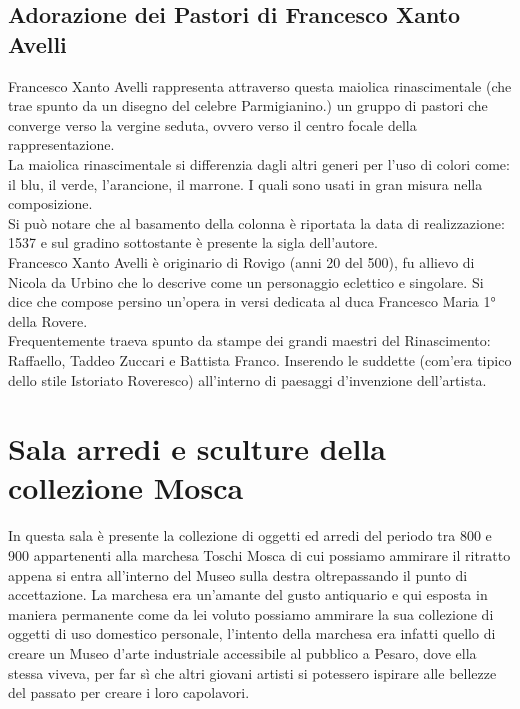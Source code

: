 \documentclass[hidelinks,12pt,a4paper]{article}
\begin{document}
\begin{flushleft}
			\subsection{Adorazione dei Pastori di Francesco Xanto Avelli}
			Francesco Xanto Avelli rappresenta attraverso questa maiolica rinascimentale (che trae spunto da un disegno del celebre Parmigianino.) un gruppo di pastori che converge verso la vergine seduta, ovvero verso il centro focale della rappresentazione.\\
			La maiolica rinascimentale si differenzia dagli altri generi per l'uso di colori come: il blu, il verde, l’arancione, il marrone. I quali sono usati in gran misura nella composizione.\\
			Si può notare che al basamento della colonna è riportata la data di realizzazione: 1537 e sul gradino sottostante è presente la sigla dell'autore.\\
			Francesco Xanto Avelli è originario di Rovigo (anni 20 del 500), fu allievo di Nicola da Urbino che lo descrive come un personaggio eclettico e singolare. Si dice che compose persino un’opera in versi dedicata al duca Francesco Maria 1° della Rovere.\\
			Frequentemente traeva spunto da stampe dei grandi maestri del Rinascimento: Raffaello, Taddeo Zuccari e Battista Franco. Inserendo le suddette (com'era tipico dello stile Istoriato Roveresco) all'interno di paesaggi d'invenzione dell'artista.
	
			\section{Sala arredi e sculture della collezione Mosca}
			In questa sala è presente la collezione di oggetti ed arredi del periodo tra 800 e 900 appartenenti alla marchesa  Toschi Mosca di cui possiamo ammirare il ritratto appena si entra all'interno del Museo sulla destra oltrepassando il punto di accettazione. La marchesa era un'amante del gusto antiquario e qui esposta in maniera permanente come da lei voluto possiamo ammirare la sua collezione di oggetti di uso domestico personale, l'intento della marchesa era infatti quello di creare un Museo d'arte industriale accessibile al pubblico a Pesaro, dove ella stessa viveva, per far sì che altri giovani artisti si potessero ispirare alle bellezze del passato per creare i loro capolavori.
	

\end{flushleft}
\end{document}

